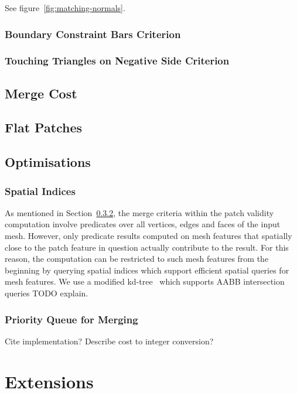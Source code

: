 \documentclass[format=sigconf]{acmart}
\begin{document}
See figure~\ref{fig:matching-normals}.

\subsubsection{Boundary Constraint Bars Criterion}

\subsubsection{Touching Triangles on Negative Side Criterion}

\subsection{Merge Cost}

\subsection{Flat Patches}

\subsection{Optimisations}

\subsubsection{Spatial Indices}

As mentioned in Section~\ref{}, the merge criteria within the patch validity computation involve predicates over all vertices, edges and faces of the input mesh. However, only predicate results computed on mesh features that spatially close to the patch feature in question actually contribute to the result. For this reason, the computation can be restricted to such mesh features from the beginning by querying spatial indices which support efficient spatial queries for mesh features. We use a modified kd-tree~\cite{} which supports AABB intersection queries TODO explain.

\subsubsection{Priority Queue for Merging}

Cite implementation? Describe cost to integer conversion?

\section{Extensions}\label{extensions}
\end{document}
